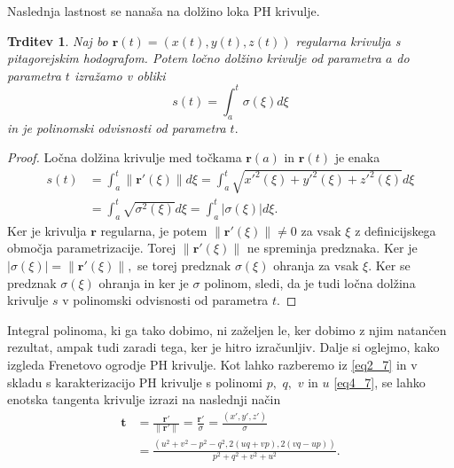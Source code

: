 \documentclass[12pt,a4paper,twoside]{article}
\theoremstyle{definition} %
\theoremstyle{plain} %
\newtheorem{trditev}[definicija]{Trditev}
\theoremstyle{primerstyle}
\numberwithin{equation}{section}  %
\newcommand{\tV}{\mathbf{t}}
\newcommand{\rV}{\mathbf{r}}
\begin{document}
Naslednja lastnost se nanaša na dolžino loka PH krivulje.
\begin{trditev}
	Naj bo $\rV(t)=(x(t),y(t),z(t))$ regularna krivulja s pitagorejskim hodografom. Potem ločno dolžino krivulje od parametra $a$ do parametra $t$ izražamo v obliki
	\begin{equation}
		s(t)=\int_a^t\sigma(\xi)d\xi
	\end{equation}
	in je polinomski odvisnosti od parametra $t.$
\end{trditev}
\begin{proof}
	Ločna dolžina krivulje med točkama $\rV(a)$ in $\rV(t)$ je enaka
	\begin{align}
		s(t)&=\int_a^t\lVert \rV'(\xi) \rVert d\xi=\int_a^t\sqrt{x'^2(\xi)+y'^2(\xi)+z'^2(\xi)}d\xi\nonumber\\
		&=\int_a^t\sqrt{\sigma^2(\xi)}d\xi=\int_a^t|\sigma(\xi)|d\xi.
	\end{align}
	Ker je krivulja $\rV$ regularna, je potem $\lVert \rV'(\xi) \rVert \neq 0$ za vsak $\xi$ z definicijskega območja parametrizacije. Torej $\lVert \rV'(\xi) \rVert$ ne spreminja predznaka. Ker je $|\sigma(\xi)|=\lVert \rV'(\xi) \rVert,$ se torej predznak $\sigma(\xi)$ ohranja za vsak $\xi.$ Ker se predznak $\sigma(\xi)$ ohranja in ker je $\sigma$ polinom, sledi, da je tudi ločna dolžina krivulje $s$ v polinomski odvisnosti od parametra $t.$
\end{proof}

Integral polinoma, ki ga tako dobimo, ni zaželjen le, ker dobimo z njim natančen rezultat, ampak tudi zaradi tega, ker je hitro izračunljiv. Dalje si oglejmo, kako izgleda Frenetovo ogrodje PH krivulje. Kot lahko razberemo iz \eqref{eq2_7} in v skladu s karakterizacijo PH krivulje s polinomi $p,$ $q,$ $v$ in $u$ \eqref{eq4_7}, se lahko enotska tangenta krivulje izrazi na naslednji način
\begin{align}
	\tV&=\frac{\rV'}{\lVert \rV' \rVert}=\frac{\rV'}{\sigma}=\frac{(x',y',z')}{\sigma} \nonumber \\
	&=\frac{(u^2+v^2-p^2-q^2,2(uq+vp),2(vq-up))}{p^2+q^2+v^2+u^2}.
\end{align}
\end{document}
